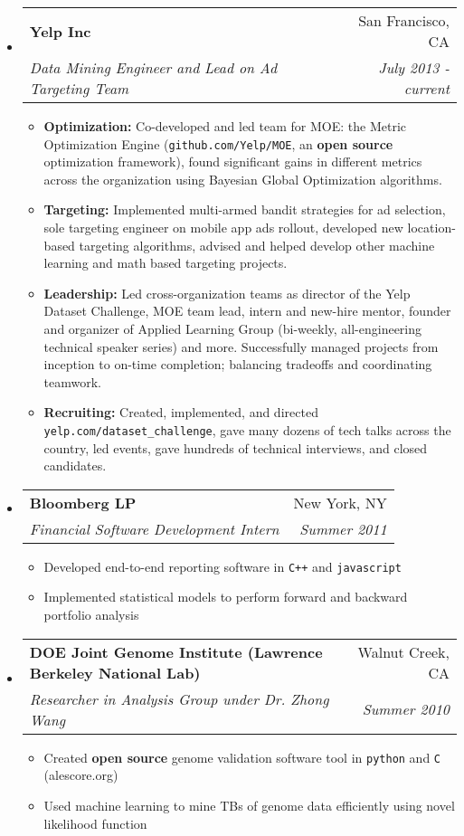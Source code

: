 \documentclass[letterpaper,11pt]{article}
\makeatletter
\newcommand{\resitem}[1]{\item #1 \vspace{-2pt}}
\newcommand{\ressubheading}[4]{
\begin{tabular*}{6.5in}{l@{\cftdotfill{\cftsecdotsep}\extracolsep{\fill}}r}
		\textbf{#1} & #2 \\
		\textit{#3} & \textit{#4} \\
\end{tabular*}\vspace{-6pt}}
\makeatother
\begin{document}
\begin{itemize}

\item
	\ressubheading{Yelp Inc}{San Francisco, CA}{Data Mining Engineer and Lead on Ad Targeting Team}{July 2013 - current}
	\begin{itemize}
            \resitem{{\bf Optimization:} Co-developed and led team for MOE: the Metric Optimization Engine (\texttt{github.com/Yelp/MOE}, an \textbf{open source} optimization framework), found significant gains in different metrics across the organization using Bayesian Global Optimization algorithms.}
            \resitem{{\bf Targeting:} Implemented multi-armed bandit strategies for ad selection, sole targeting engineer on mobile app ads rollout, developed new location-based targeting algorithms, advised and helped develop other machine learning and math based targeting projects.}
            \resitem{{\bf Leadership:} Led cross-organization teams as director of the Yelp Dataset Challenge, MOE team lead, intern and new-hire mentor, founder and organizer of Applied Learning Group (bi-weekly, all-engineering technical speaker series) and more. Successfully managed projects from inception to on-time completion; balancing tradeoffs and coordinating teamwork.}
            \resitem{{\bf Recruiting:} Created, implemented, and directed \texttt{yelp.com/dataset\_challenge}, gave many dozens of tech talks across the country, led events, gave hundreds of technical interviews, and closed candidates.}
	\end{itemize}

\item
	\ressubheading{Bloomberg LP}{New York, NY}{Financial Software Development Intern}{Summer 2011}
	\begin{itemize}
		\resitem{Developed end-to-end reporting software in \texttt{C++} and \texttt{javascript}}
    \resitem{Implemented statistical models to perform forward and backward portfolio analysis}
	\end{itemize}

\item
	\ressubheading{DOE Joint Genome Institute (Lawrence Berkeley National Lab)}{Walnut Creek, CA}{Researcher in Analysis Group under Dr. Zhong Wang}{Summer 2010}
	\begin{itemize}
		\resitem{Created \textbf{open source} genome validation software tool in \texttt{python} and \texttt{C} (alescore.org)}
    \resitem{Used machine learning to mine TBs of genome data efficiently using novel likelihood function}
	\end{itemize}


\end{itemize}
\end{document}

